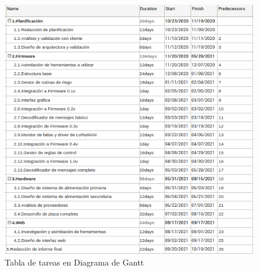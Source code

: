 \documentclass[11pt]{charter}
\begin{document}


\begin{figure}[htpb]
\centering 
\includegraphics[width=\textwidth]{./Figuras/gantT.png}
\caption{Tabla de tareas en Diagrama de Gantt}
\label{fig:redLoRa}
\end{figure}
\end{document}
